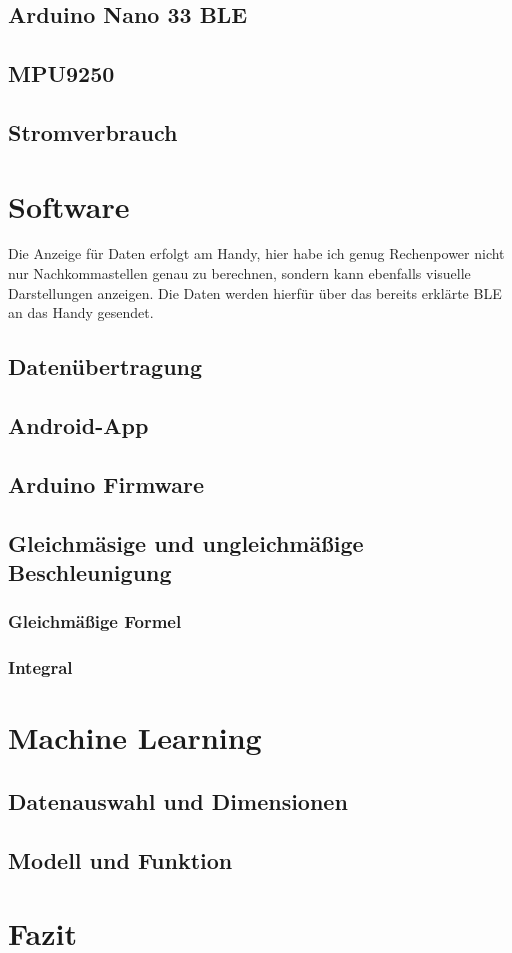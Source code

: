 \documentclass[12pt,titlepage]{scrreprt}
\begin{document}
\section{Arduino Nano 33 BLE}

\section{MPU9250}

\section{Stromverbrauch}


\chapter{Software}
Die Anzeige für Daten erfolgt am Handy, hier habe ich genug Rechenpower
nicht nur Nachkommastellen genau zu berechnen, sondern kann ebenfalls 
visuelle Darstellungen anzeigen. Die Daten werden hierfür über das bereits
erklärte BLE an das Handy gesendet.
\section{Datenübertragung}

\section{Android-App}

\section{Arduino Firmware}

\section{Gleichmäsige und ungleichmäßige Beschleunigung}

\subsection{Gleichmäßige Formel}

\subsection{Integral}


\chapter{Machine Learning}
\section{Datenauswahl und Dimensionen}

\section{Modell und Funktion}


\chapter{Fazit}




\end{document}
